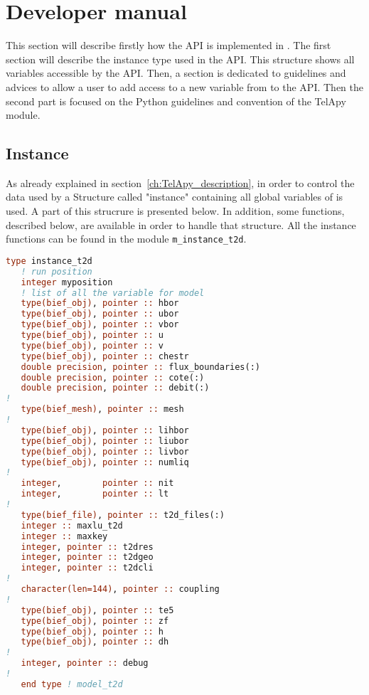 \chapter{Developer manual}
\label{ch:hydrod:sim}

This section will describe firstly how the API is implemented in \fortran.
The first section will describe the instance type used in the API\@. This
structure shows all variables accessible by the \fortran API\@. Then, a
section is dedicated to guidelines and advices to allow a user to add access to
a new variable from  to the API\@.
Then the second part is focused on the Python guidelines and convention
of the TelApy module.
%
\section{Instance}
%
As already explained in section~\ref{ch:TelApy_description}, in order to
control the data used by  a \fortran Structure called "instance"
containing all global variables of  is used. A part of this
strucrure is presented below.  In addition, some functions, described below,
are available in order to handle that structure. All the instance functions can
be found in the module
\verb!m_instance_t2d!.

\begin{lstlisting}[language=Fortran]
type instance_t2d
   ! run position
   integer myposition
   ! list of all the variable for model
   type(bief_obj), pointer :: hbor
   type(bief_obj), pointer :: ubor
   type(bief_obj), pointer :: vbor
   type(bief_obj), pointer :: u
   type(bief_obj), pointer :: v
   type(bief_obj), pointer :: chestr
   double precision, pointer :: flux_boundaries(:)
   double precision, pointer :: cote(:)
   double precision, pointer :: debit(:)
!
   type(bief_mesh), pointer :: mesh
!
   type(bief_obj), pointer :: lihbor
   type(bief_obj), pointer :: liubor
   type(bief_obj), pointer :: livbor
   type(bief_obj), pointer :: numliq
!
   integer,        pointer :: nit
   integer,        pointer :: lt
!
   type(bief_file), pointer :: t2d_files(:)
   integer :: maxlu_t2d
   integer :: maxkey
   integer, pointer :: t2dres
   integer, pointer :: t2dgeo
   integer, pointer :: t2dcli
!
   character(len=144), pointer :: coupling
!
   type(bief_obj), pointer :: te5
   type(bief_obj), pointer :: zf
   type(bief_obj), pointer :: h
   type(bief_obj), pointer :: dh
!
   integer, pointer :: debug
!
   end type ! model_t2d
\end{lstlisting}

